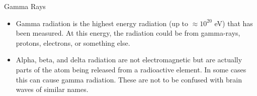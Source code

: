 {\Large Gamma Rays}
\begin{itemize}

\item Gamma radiation is the highest energy radiation (up to $\approx 10^{20}$ eV) that has been measured. At this energy, the radiation could be from gamma-rays, protons, electrons, or something else.

\item Alpha, beta, and delta radiation are not electromagnetic but are actually parts of the atom being released from a radioactive element. In some cases this can cause gamma radiation. These are not to be confused with brain waves of similar names.

\end{itemize}
